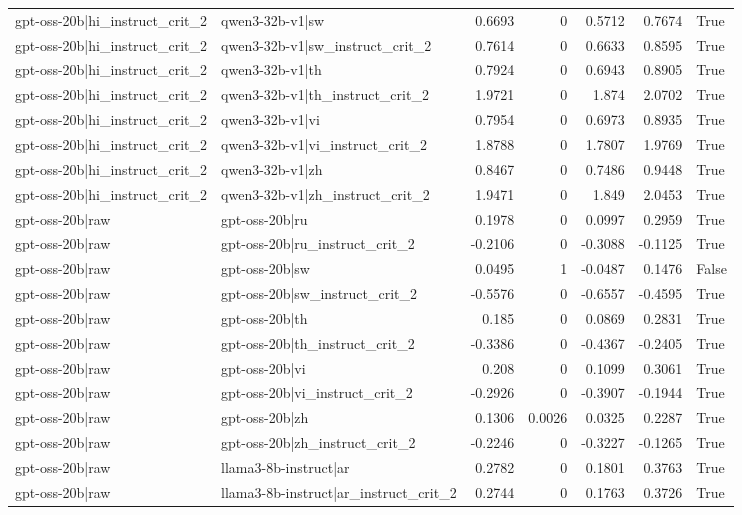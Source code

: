 \begin{table}
\begin{tabular}{l l r r r r l}
gpt-oss-20b|hi_instruct_crit_2 & qwen3-32b-v1|sw & 0.6693 & 0 & 0.5712 & 0.7674 & True \\
gpt-oss-20b|hi_instruct_crit_2 & qwen3-32b-v1|sw_instruct_crit_2 & 0.7614 & 0 & 0.6633 & 0.8595 & True \\
gpt-oss-20b|hi_instruct_crit_2 & qwen3-32b-v1|th & 0.7924 & 0 & 0.6943 & 0.8905 & True \\
gpt-oss-20b|hi_instruct_crit_2 & qwen3-32b-v1|th_instruct_crit_2 & 1.9721 & 0 & 1.874 & 2.0702 & True \\
gpt-oss-20b|hi_instruct_crit_2 & qwen3-32b-v1|vi & 0.7954 & 0 & 0.6973 & 0.8935 & True \\
gpt-oss-20b|hi_instruct_crit_2 & qwen3-32b-v1|vi_instruct_crit_2 & 1.8788 & 0 & 1.7807 & 1.9769 & True \\
gpt-oss-20b|hi_instruct_crit_2 & qwen3-32b-v1|zh & 0.8467 & 0 & 0.7486 & 0.9448 & True \\
gpt-oss-20b|hi_instruct_crit_2 & qwen3-32b-v1|zh_instruct_crit_2 & 1.9471 & 0 & 1.849 & 2.0453 & True \\
gpt-oss-20b|raw & gpt-oss-20b|ru & 0.1978 & 0 & 0.0997 & 0.2959 & True \\
gpt-oss-20b|raw & gpt-oss-20b|ru_instruct_crit_2 & -0.2106 & 0 & -0.3088 & -0.1125 & True \\
gpt-oss-20b|raw & gpt-oss-20b|sw & 0.0495 & 1 & -0.0487 & 0.1476 & False \\
gpt-oss-20b|raw & gpt-oss-20b|sw_instruct_crit_2 & -0.5576 & 0 & -0.6557 & -0.4595 & True \\
gpt-oss-20b|raw & gpt-oss-20b|th & 0.185 & 0 & 0.0869 & 0.2831 & True \\
gpt-oss-20b|raw & gpt-oss-20b|th_instruct_crit_2 & -0.3386 & 0 & -0.4367 & -0.2405 & True \\
gpt-oss-20b|raw & gpt-oss-20b|vi & 0.208 & 0 & 0.1099 & 0.3061 & True \\
gpt-oss-20b|raw & gpt-oss-20b|vi_instruct_crit_2 & -0.2926 & 0 & -0.3907 & -0.1944 & True \\
gpt-oss-20b|raw & gpt-oss-20b|zh & 0.1306 & 0.0026 & 0.0325 & 0.2287 & True \\
gpt-oss-20b|raw & gpt-oss-20b|zh_instruct_crit_2 & -0.2246 & 0 & -0.3227 & -0.1265 & True \\
gpt-oss-20b|raw & llama3-8b-instruct|ar & 0.2782 & 0 & 0.1801 & 0.3763 & True \\
gpt-oss-20b|raw & llama3-8b-instruct|ar_instruct_crit_2 & 0.2744 & 0 & 0.1763 & 0.3726 & True \\

\end{tabular}
\end{table}

